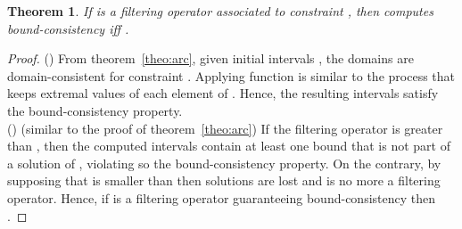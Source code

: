 \documentclass[submission,copyright,creativecommons]{eptcs}
\newtheorem{theorem}{Theorem}
\newtheorem{proof}{Proof}
\begin{document}
\begin{theorem}
 If  is a filtering operator associated to constraint , then   computes 
 bound-consistency iff . 
\end{theorem}

\begin{proof}
  () From theorem~\ref{theo:arc}, given initial intervals , 
  the domains  are domain-consistent for constraint .
  Applying function  is similar to the process that keeps extremal values of each element of 
  . Hence, the resulting intervals satisfy the 
  bound-consistency property.\\
  () (similar to the proof of theorem~\ref{theo:arc}) 
  If the filtering operator  is greater than , 
  then the computed intervals contain at least one bound that is not part
  of a solution of , violating so the bound-consistency property.
  On the contrary, by supposing that  is smaller than
   then solutions are lost and  is no more a filtering operator.
  Hence, if  is a filtering operator guaranteeing bound-consistency
  then . 
\end{proof}



\end{document}
